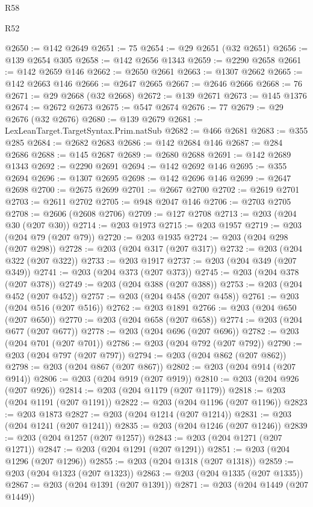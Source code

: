 \begin{lexlean}{R58}
\begin{lexlean}{R52}
\begin{coremodule}
{{{{{{{{{{{{{{{{{{{{{{{{{{{{{{{{{{{{{{{{{{{{{{{{{{{{{{{{{{{{{{{{{{{{{{{{{{{{{{{{{{{{{{{{{{{{{{{{{{{{{{{{{{{{{{{{{{{{{{{{{{{{{{{{{{{{{{{{{{{{{{{{{{{{{{{{{{{{{{{{{{{{{{{{{{{{{{{{{{{{{{{{{{{{{{{{{{{{{{@2650 := @142 @2649
@2651 := 75
@2654 := @29 @2651 (@32 @2651)
@2656 := @139 @2654 @305
@2658 := @142 @2656 @1343
@2659 := @2290 @2658
@2661 := @142 @2659 @146
@2662 := @2650 @2661
@2663 := @1307 @2662
@2665 := @142 @2663 @146
@2666 := @2647 @2665
@2667 := @2646 @2666
@2668 := 76
@2671 := @29 @2668 (@32 @2668)
@2672 := @139 @2671
@2673 := @145 @1376
@2674 := @2672 @2673
@2675 := @547 @2674
@2676 := 77
@2679 := @29 @2676 (@32 @2676)
@2680 := @139 @2679
@2681 := LexLeanTarget.TargetSyntax.Prim.natSub
@2682 := @466 @2681
@2683 := @355 @285
@2684 := @2682 @2683
@2686 := @142 @2684 @146
@2687 := @284 @2686
@2688 := @145 @2687
@2689 := @2680 @2688
@2691 := @142 @2689 @1343
@2692 := @2290 @2691
@2694 := @142 @2692 @146
@2695 := @355 @2694
@2696 := @1307 @2695
@2698 := @142 @2696 @146
@2699 := @2647 @2698
@2700 := @2675 @2699
@2701 := @2667 @2700
@2702 := @2619 @2701
@2703 := @2611 @2702
@2705 := @948 @2047 @146
@2706 := @2703 @2705
@2708 := @2606 (@2608 @2706)
@2709 := @127 @2708
@2713 := @203 (@204 @30 (@207 @30))
@2714 := @203 @1973
@2715 := @203 @1957
@2719 := @203 (@204 @79 (@207 @79))
@2720 := @203 @1935
@2724 := @203 (@204 @298 (@207 @298))
@2728 := @203 (@204 @317 (@207 @317))
@2732 := @203 (@204 @322 (@207 @322))
@2733 := @203 @1917
@2737 := @203 (@204 @349 (@207 @349))
@2741 := @203 (@204 @373 (@207 @373))
@2745 := @203 (@204 @378 (@207 @378))
@2749 := @203 (@204 @388 (@207 @388))
@2753 := @203 (@204 @452 (@207 @452))
@2757 := @203 (@204 @458 (@207 @458))
@2761 := @203 (@204 @516 (@207 @516))
@2762 := @203 @1891
@2766 := @203 (@204 @650 (@207 @650))
@2770 := @203 (@204 @658 (@207 @658))
@2774 := @203 (@204 @677 (@207 @677))
@2778 := @203 (@204 @696 (@207 @696))
@2782 := @203 (@204 @701 (@207 @701))
@2786 := @203 (@204 @792 (@207 @792))
@2790 := @203 (@204 @797 (@207 @797))
@2794 := @203 (@204 @862 (@207 @862))
@2798 := @203 (@204 @867 (@207 @867))
@2802 := @203 (@204 @914 (@207 @914))
@2806 := @203 (@204 @919 (@207 @919))
@2810 := @203 (@204 @926 (@207 @926))
@2814 := @203 (@204 @1179 (@207 @1179))
@2818 := @203 (@204 @1191 (@207 @1191))
@2822 := @203 (@204 @1196 (@207 @1196))
@2823 := @203 @1873
@2827 := @203 (@204 @1214 (@207 @1214))
@2831 := @203 (@204 @1241 (@207 @1241))
@2835 := @203 (@204 @1246 (@207 @1246))
@2839 := @203 (@204 @1257 (@207 @1257))
@2843 := @203 (@204 @1271 (@207 @1271))
@2847 := @203 (@204 @1291 (@207 @1291))
@2851 := @203 (@204 @1296 (@207 @1296))
@2855 := @203 (@204 @1318 (@207 @1318))
@2859 := @203 (@204 @1323 (@207 @1323))
@2863 := @203 (@204 @1335 (@207 @1335))
@2867 := @203 (@204 @1391 (@207 @1391))
@2871 := @203 (@204 @1449 (@207 @1449))
}}}}}}}}}}}}}}}}}}}}}}}}}}}}}}}}}}}}}}}}}}}}}}}}}}}}}}}}}}}}}}}}}}}}}}}}}}}}}}}}}}}}}}}}}}}}}}}}}}}}}}}}}}}}}}}}}}}}}}}}}}}}}}}}}}}}}}}}}}}}}}}}}}}}}}}}}}}}}}}}}}}}}}}}}}}}}}}}}}}}}}}}}}}}}}}}}}}}}}
\end{coremodule}
\end{lexlean}
\end{lexlean}
